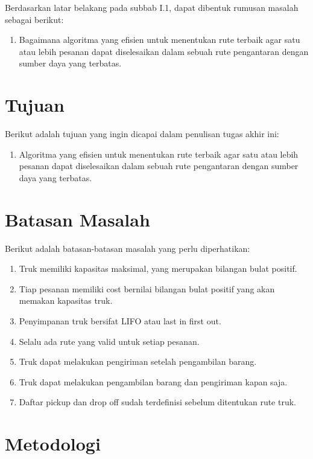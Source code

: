 Berdasarkan latar belakang pada subbab I.1, dapat dibentuk rumusan masalah sebagai berikut:

\begin{enumerate}
    \item Bagaimana algoritma yang efisien untuk menentukan rute terbaik agar satu atau lebih pesanan dapat diselesaikan dalam sebuah rute pengantaran dengan sumber daya yang terbatas.
\end{enumerate}

\section{Tujuan}

Berikut adalah tujuan yang ingin dicapai dalam penulisan tugas akhir ini:

\begin{enumerate}
    \item Algoritma yang efisien untuk menentukan rute terbaik agar satu atau lebih pesanan dapat diselesaikan dalam sebuah rute pengantaran dengan sumber daya yang terbatas.
\end{enumerate}

\section{Batasan Masalah}

Berikut adalah batasan-batasan masalah yang perlu diperhatikan:

\begin{enumerate}
    \item Truk memiliki kapasitas maksimal, yang merupakan bilangan bulat positif.
    \item Tiap pesanan memiliki cost bernilai bilangan bulat positif yang akan memakan kapasitas truk.
    \item Penyimpanan truk bersifat LIFO atau last in first out.
    \item Selalu ada rute yang valid untuk setiap pesanan.
    \item Truk dapat melakukan pengiriman setelah pengambilan barang.
    \item Truk dapat melakukan pengambilan barang dan pengiriman kapan saja.
    \item Daftar pickup dan drop off sudah terdefinisi sebelum ditentukan rute truk.
\end{enumerate}

\section{Metodologi}

